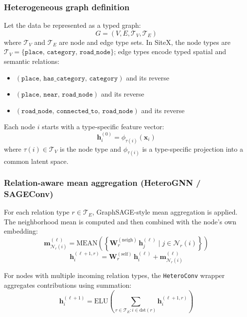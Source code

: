 \subsubsection{Heterogeneous graph definition}
Let the data be represented as a typed graph:
\begin{equation}
G=(V,E,\mathcal{T}_V,\mathcal{T}_E)
\end{equation}
where $\mathcal{T}_V$ and $\mathcal{T}_E$ are node and edge type sets. In SiteX, the node types are $\mathcal{T}_V = \{\texttt{place},\, \texttt{category},\, \texttt{road\_node}\}$; edge types encode typed spatial and semantic relations:
\begin{itemize}
    \item $(\texttt{place},\, \texttt{has\_category},\, \texttt{category})$ and its reverse
    \item $(\texttt{place},\, \texttt{near},\, \texttt{road\_node})$ and its reverse
    \item $(\texttt{road\_node},\, \texttt{connected\_to},\, \texttt{road\_node})$ and its reverse
\end{itemize}

Each node $i$ starts with a type-specific feature vector:
\begin{equation}
\mathbf{h}_i^{(0)} = \phi_{\tau(i)}(\mathbf{x}_i)
\end{equation}
where $\tau(i)\in\mathcal{T}_V$ is the node type and $\phi_{\tau(i)}$ is a type-specific projection into a common latent space.

\subsubsection{Relation-aware mean aggregation (HeteroGNN / SAGEConv)}
For each relation type $r\in\mathcal{T}_E$, GraphSAGE-style mean aggregation is applied. The neighborhood mean is computed and then combined with the node's own embedding:
\begin{equation}
\mathbf{m}_{\mathcal{N}_r(i)}^{(\ell)} = \text{MEAN}\left(\left\{\mathbf{W}_r^{(\text{neigh})}\,\mathbf{h}_j^{(\ell)} \mid j\in\mathcal{N}_r(i)\right\}\right)
\end{equation}
\begin{equation}
\mathbf{h}_i^{(\ell+1,r)} = \mathbf{W}_r^{(\text{self})}\,\mathbf{h}_i^{(\ell)} + \mathbf{m}_{\mathcal{N}_r(i)}^{(\ell)}
\end{equation}

For nodes with multiple incoming relation types, the \texttt{HeteroConv} wrapper aggregates contributions using summation:
\begin{equation}
\mathbf{h}_i^{(\ell+1)} = \text{ELU}\!\left(\sum_{r\in\mathcal{T}_E : i\in\text{dst}(r)} \mathbf{h}_i^{(\ell+1,r)}\right)
\end{equation}

